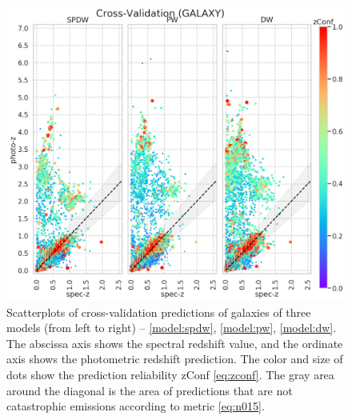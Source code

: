 \documentclass[fleqn,usenatbib]{mnras}
\begin{document}
\begin{figure}
    \centering
    \includegraphics[width=0.9\linewidth]{images/scatterplots-cv2-gal.png}
    \caption{Scatterplots of cross-validation predictions of galaxies of three models (from left to right) -- \ref{model:spdw}, \ref{model:pw}, \ref{model:dw}. The abscissa axis shows the spectral redshift value, and the ordinate axis shows the photometric redshift prediction. The color and size of dots show the prediction reliability zConf \eqref{eq:zconf}. The gray area around the diagonal is the area of predictions that are not catastrophic emissions according to metric \eqref{eq:n015}.}
    \label{fig:scatter-cv2-gal}
\end{figure}

\end{document}
